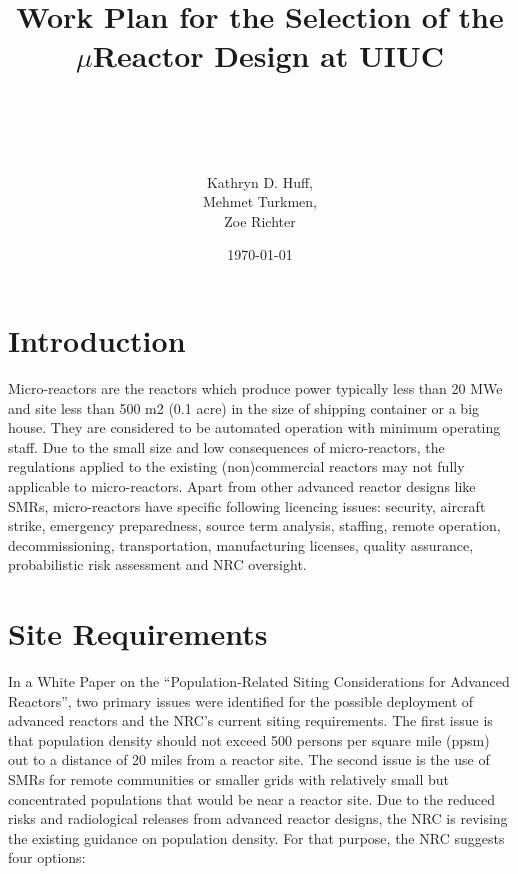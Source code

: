 \documentclass[10pt,a4paper]{article}
\begin{document}
\title{Work Plan for the Selection of the $\mu$Reactor Design at UIUC\\}
\author{\\ \\ \\ \\ Kathryn D. Huff,\\
Mehmet Turkmen,\\
Zoe Richter}
\date{\today}
\maketitle

\pagebreak
\tableofcontents


\printglossary


\pagebreak
\section{Introduction}
Micro-reactors are the reactors which produce power typically less than 20 MWe and site less than 500 m2 (0.1 acre) in the size of shipping container or a big house. They are considered to be automated operation with minimum operating staff. Due to the small size and low consequences of micro-reactors, the regulations applied to the existing (non)commercial reactors may not fully applicable to micro-reactors. Apart from other advanced reactor designs like \gls{SMR}s, micro-reactors have specific following licencing issues: security, aircraft strike, emergency preparedness, source term analysis, staffing, remote operation, decommissioning, transportation, manufacturing licenses, quality assurance, probabilistic risk assessment and \gls{NRC} oversight.



\pagebreak
\section{Site Requirements}

In a White Paper \cite{nrc_staff_population-related_2019} on the “Population-Related Siting Considerations for Advanced Reactors”, two primary issues were identified for the possible deployment of advanced reactors and the NRC’s current siting requirements. The first issue is that population density should not exceed 500 persons per square mile (ppsm) out to a distance of 20 miles from a reactor site. The second issue is the use of SMRs for remote communities or smaller grids with relatively small but concentrated populations that would be near a reactor site. Due to the reduced risks and radiological releases from advanced reactor designs, the NRC is revising the existing guidance on population density.  For that purpose, the NRC suggests four options:
\end{document}
